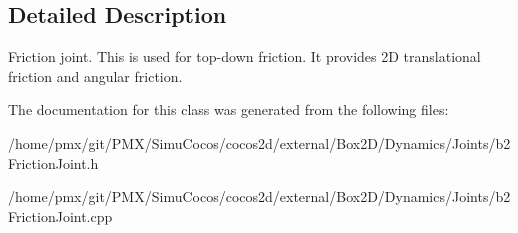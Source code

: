 \subsection{Detailed Description}
Friction joint. This is used for top-\/down friction. It provides 2D translational friction and angular friction. 

The documentation for this class was generated from the following files\+:\begin{DoxyCompactItemize}
\item 
/home/pmx/git/\+P\+M\+X/\+Simu\+Cocos/cocos2d/external/\+Box2\+D/\+Dynamics/\+Joints/b2\+Friction\+Joint.\+h\item 
/home/pmx/git/\+P\+M\+X/\+Simu\+Cocos/cocos2d/external/\+Box2\+D/\+Dynamics/\+Joints/b2\+Friction\+Joint.\+cpp\end{DoxyCompactItemize}
